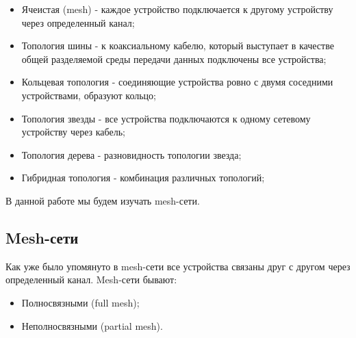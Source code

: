 \documentclass[a4paper]{article}
\begin{document}
\begin{itemize}
    \item Ячеистая (mesh) - каждое устройство подключается к другому устройству через определенный канал;
    \item Топология шины - к коаксиальному кабелю, который выступает в качестве общей разделяемой среды передачи данных подключены все устройства;
    \item Кольцевая топология - соединяющие устройства ровно с двумя соседними устройствами, образуют кольцо;
    \item Топология звезды - все устройства подключаются к одному сетевому устройству через кабель;
    \item Топология дерева - разновидность топологии звезда;
    \item Гибридная топология - комбинация различных топологий;
\end{itemize}
В данной работе мы будем изучать mesh-сети.
\subsection{Mesh-сети}
Как уже было упомянуто в mesh-сети все устройства связаны друг с другом через определенный канал.
Mesh-сети бывают: 
\begin{itemize}
    \item Полносвязными (full mesh);
    \item Неполносвязными (partial mesh).
\end{itemize}
\end{document}
